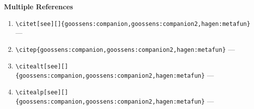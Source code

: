 \documentclass[12pt]{article}
\begin{document}
\textbf{Multiple References}

\begin{enumerate}
\item
\verb|\citet[see][]{goossens:companion,goossens:companion2,hagen:metafun}| ---
\citet[see][]{goossens:companion,goossens:companion2,hagen:metafun}
\item
\verb|\citep{goossens:companion,goossens:companion2,hagen:metafun}| ---
\citep{goossens:companion,goossens:companion2,hagen:metafun}
\item
\verb|\citealt[see][]{goossens:companion,goossens:companion2,hagen:metafun}| ---
\citealt[see][]{goossens:companion,goossens:companion2,hagen:metafun}
\item
\verb|\citealp[see][]{goossens:companion,goossens:companion2,hagen:metafun}| ---
\citealp[see][]{goossens:companion,goossens:companion2,hagen:metafun}
\end{enumerate}


\end{document}
